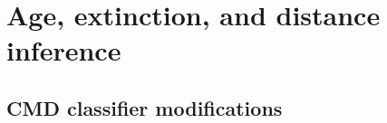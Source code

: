


\section{Age, extinction, and distance inference}\label{c3:sec:agenn}
\subsection{CMD classifier modifications}

